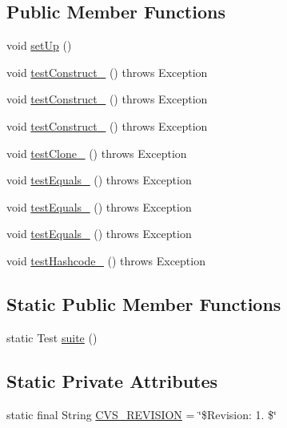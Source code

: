 \subsection*{Public Member Functions}
\begin{DoxyCompactItemize}
\item 
void \hyperlink{classorg_1_1jgap_1_1audit_1_1_keyed_value_test_af54650a6d5bc38290d7235fff0b550ae}{set\-Up} ()
\item 
void \hyperlink{classorg_1_1jgap_1_1audit_1_1_keyed_value_test_a42b66ddf9d499b4cc4e3074e87eeff05}{test\-Construct\-\_} ()  throws Exception 
\item 
void \hyperlink{classorg_1_1jgap_1_1audit_1_1_keyed_value_test_a9d5dabe6443e255bb9c5489a8dda7c8f}{test\-Construct\-\_} ()  throws Exception 
\item 
void \hyperlink{classorg_1_1jgap_1_1audit_1_1_keyed_value_test_aef07233eb8411f32844722c0b6be3edc}{test\-Construct\-\_} ()  throws Exception 
\item 
void \hyperlink{classorg_1_1jgap_1_1audit_1_1_keyed_value_test_a1255a9bce9adf43ebe0b5e472a340cae}{test\-Clone\-\_} ()  throws Exception 
\item 
void \hyperlink{classorg_1_1jgap_1_1audit_1_1_keyed_value_test_a161ddbce9d1d9b6e095835b15bd3326b}{test\-Equals\-\_} ()  throws Exception 
\item 
void \hyperlink{classorg_1_1jgap_1_1audit_1_1_keyed_value_test_a9f889bc862805e2642d9e8c3981e232f}{test\-Equals\-\_} ()  throws Exception 
\item 
void \hyperlink{classorg_1_1jgap_1_1audit_1_1_keyed_value_test_ae096fb21f69b1743e64544503e9e2eac}{test\-Equals\-\_} ()  throws Exception 
\item 
void \hyperlink{classorg_1_1jgap_1_1audit_1_1_keyed_value_test_a863c09ef158b384e5ecd3a838ce1682a}{test\-Hashcode\-\_} ()  throws Exception 
\end{DoxyCompactItemize}
\subsection*{Static Public Member Functions}
\begin{DoxyCompactItemize}
\item 
static Test \hyperlink{classorg_1_1jgap_1_1audit_1_1_keyed_value_test_a6809f690f97b28ec54143f64b5208153}{suite} ()
\end{DoxyCompactItemize}
\subsection*{Static Private Attributes}
\begin{DoxyCompactItemize}
\item 
static final String \hyperlink{classorg_1_1jgap_1_1audit_1_1_keyed_value_test_a17414fa519ccb19da562b5bb3bfd9e09}{C\-V\-S\-\_\-\-R\-E\-V\-I\-S\-I\-O\-N} = \char`\"{}\$Revision\-: 1. \$\char`\"{}
\end{DoxyCompactItemize}
